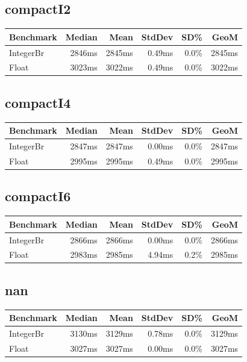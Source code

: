 {\subsection*{compactI2}
\begin{tabular}{|l|r|r|r|r|r|}
\hline
\textbf{Benchmark} & \textbf{Median} & \textbf{Mean} & \textbf{StdDev} & \textbf{SD\%} & \textbf{GeoM} \\ \hline
IntegerBr & 2846ms & 2845ms & 0.49ms & 0.0\% & 2845ms \\ \hline
Float & 3023ms & 3022ms & 0.49ms & 0.0\% & 3022ms \\ \hline
\end{tabular}

\subsection*{compactI4}
\begin{tabular}{|l|r|r|r|r|r|}
\hline
\textbf{Benchmark} & \textbf{Median} & \textbf{Mean} & \textbf{StdDev} & \textbf{SD\%} & \textbf{GeoM} \\ \hline
IntegerBr & 2847ms & 2847ms & 0.00ms & 0.0\% & 2847ms \\ \hline
Float & 2995ms & 2995ms & 0.49ms & 0.0\% & 2995ms \\ \hline
\end{tabular}

\subsection*{compactI6}
\begin{tabular}{|l|r|r|r|r|r|}
\hline
\textbf{Benchmark} & \textbf{Median} & \textbf{Mean} & \textbf{StdDev} & \textbf{SD\%} & \textbf{GeoM} \\ \hline
IntegerBr & 2866ms & 2866ms & 0.00ms & 0.0\% & 2866ms \\ \hline
Float & 2983ms & 2985ms & 4.94ms & 0.2\% & 2985ms \\ \hline
\end{tabular}

\subsection*{nan}
\begin{tabular}{|l|r|r|r|r|r|}
\hline
\textbf{Benchmark} & \textbf{Median} & \textbf{Mean} & \textbf{StdDev} & \textbf{SD\%} & \textbf{GeoM} \\ \hline
IntegerBr & 3130ms & 3129ms & 0.78ms & 0.0\% & 3129ms \\ \hline
Float & 3027ms & 3027ms & 0.00ms & 0.0\% & 3027ms \\ \hline
\end{tabular}

}
